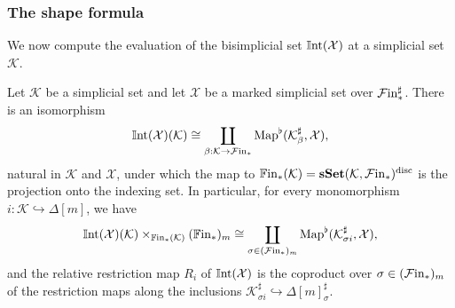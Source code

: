 \documentclass[10pt,reqno]{amsart}
\begin{document}
\subsubsection{The shape formula}

\label{subsubsec:strings_auxiliary}

We now compute the evaluation of the bisimplicial set
$\mathbb{I}\mathrm{nt}(\mathcal X)$ at a simplicial set $\mathcal K$.

\begin{proposition}
\label{prop:matching_identification}
Let $\mathcal K$ be a simplicial set and let $\mathcal X$ be a
marked simplicial set over $\mathcal{F}\mathrm{in}_*^\sharp$. There is an isomorphism
\begin{equation}
\label{eq:strings_shape_identification}
 \mathbb{I}\mathrm{nt}(\mathcal X)(\mathcal K)\cong\coprod_{\beta:\mathcal K\to \mathcal{F}\mathrm{in}_*}
 \operatorname{Map}^\flat(\mathcal K^\sharp_\beta,\mathcal X),
\end{equation}
natural in $\mathcal K$ and $\mathcal X$, under which the map to
$\mathbb{F}\mathrm{in}_*(\mathcal K)=\mathbf{sSet}(\mathcal K,\mathcal{F}\mathrm{in}_*)^{\mathrm{disc}}$ is
the projection onto the indexing set. In particular, for every
monomorphism $i:\mathcal K\hookrightarrow\Delta[m]$, we have
\begin{equation}
\label{eq:strings_relative_shape_identification}
 \mathbb{I}\mathrm{nt}(\mathcal X)(\mathcal K)\times_{\mathbb{F}\mathrm{in}_*(\mathcal K)}(\mathbb{F}\mathrm{in}_*)_m
 \cong\coprod_{\sigma\in (\mathcal{F}\mathrm{in}_*)_m}
 \operatorname{Map}^\flat(\mathcal K^\sharp_{\sigma i},\mathcal X),
\end{equation}
and the relative restriction map $R_i$ of $\mathbb{I}\mathrm{nt}(\mathcal X)$ is the
coproduct over $\sigma\in (\mathcal{F}\mathrm{in}_*)_m$ of the restriction maps along
the inclusions
$
 \mathcal K^\sharp_{\sigma i}\hookrightarrow\Delta[m]^\sharp_\sigma.
$
\end{proposition}
\end{document}
